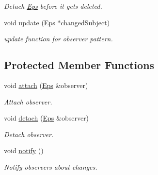 \begin{DoxyCompactItemize}
\begin{DoxyCompactList}\small\item\em Detach \hyperlink{classSpacy_1_1Mixin_1_1Eps}{Eps} before it gets deleted. \end{DoxyCompactList}\item 
\hypertarget{classSpacy_1_1Mixin_1_1Eps_a151216968daef3da5f5cdc0b957ce01b}{}void \hyperlink{classSpacy_1_1Mixin_1_1Eps_a151216968daef3da5f5cdc0b957ce01b}{update} (\hyperlink{classSpacy_1_1Mixin_1_1Eps_a51dbe0b9cc950e0f3dfd34a481f08ae4_a51dbe0b9cc950e0f3dfd34a481f08ae4}{Eps} $\ast$changed\+Subject)\label{classSpacy_1_1Mixin_1_1Eps_a151216968daef3da5f5cdc0b957ce01b}

\begin{DoxyCompactList}\small\item\em update function for observer pattern. \end{DoxyCompactList}\end{DoxyCompactItemize}
\subsection*{Protected Member Functions}
\begin{DoxyCompactItemize}
\item 
\hypertarget{classSpacy_1_1Mixin_1_1MixinConnection_abb5520ee6b22dd993d78f142939a1ed4}{}void \hyperlink{classSpacy_1_1Mixin_1_1MixinConnection_abb5520ee6b22dd993d78f142939a1ed4}{attach} (\hyperlink{classSpacy_1_1Mixin_1_1Eps_a51dbe0b9cc950e0f3dfd34a481f08ae4_a51dbe0b9cc950e0f3dfd34a481f08ae4}{Eps} \&observer)\label{classSpacy_1_1Mixin_1_1MixinConnection_abb5520ee6b22dd993d78f142939a1ed4}

\begin{DoxyCompactList}\small\item\em Attach observer. \end{DoxyCompactList}\item 
\hypertarget{classSpacy_1_1Mixin_1_1MixinConnection_adda739590c487679c26f60e50aedb73f}{}void \hyperlink{classSpacy_1_1Mixin_1_1MixinConnection_adda739590c487679c26f60e50aedb73f}{detach} (\hyperlink{classSpacy_1_1Mixin_1_1Eps_a51dbe0b9cc950e0f3dfd34a481f08ae4_a51dbe0b9cc950e0f3dfd34a481f08ae4}{Eps} \&observer)\label{classSpacy_1_1Mixin_1_1MixinConnection_adda739590c487679c26f60e50aedb73f}

\begin{DoxyCompactList}\small\item\em Detach observer. \end{DoxyCompactList}\item 
\hypertarget{classSpacy_1_1Mixin_1_1MixinConnection_a1ddeaa78a3bb4a38c2cca36d1f99fe36}{}void \hyperlink{classSpacy_1_1Mixin_1_1MixinConnection_a1ddeaa78a3bb4a38c2cca36d1f99fe36}{notify} ()\label{classSpacy_1_1Mixin_1_1MixinConnection_a1ddeaa78a3bb4a38c2cca36d1f99fe36}

\begin{DoxyCompactList}\small\item\em Notify observers about changes. \end{DoxyCompactList}\end{DoxyCompactItemize}


